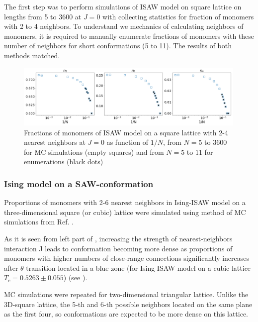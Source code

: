 The first step was to perform simulations of ISAW model on square lattice on lengths from 5 to 3600 at $J=0$ with collecting statistics for fraction of monomers with 2 to 4 neighbors. 
To understand we mechanics of calculating neighbors of monomers, it is required to manually enumerate fractions of monomers with these number of neighbors for short conformations (5 to 11). 
The results of both methods matched.

\begin{figure}[h!]
    \centering
    \includegraphics[width=0.99\textwidth]{Images/ISAWJ0_Bulk2-4.png}
    \caption{Fractions of monomers of ISAW model on a square lattice with 2-4 nearest neighbors at $J=0$ as function of $1/N$, from $N = 5$ to $3600$ for MC simulations (empty squares) and from $N = 5$ to $11$ for enumerations (black dots)}
    \label{fig:Ising_vs_ISAW}
\end{figure}

\subsubsection{Ising model on a SAW-conformation}

Proportions of monomers with 2-6 nearest neighbors in Ising-ISAW model on a three-dimensional square (or cubic) lattice were simulated using method of MC simulations from Ref. \cite{faizullina2021critical}.

As it is seen from left part of , increasing the strength of nearest-neighbors interaction J leads to conformation becoming more dense as proportions of monomers with higher numbers of close-range connections significantly increases after $\theta$-transition located in a blue zone (for Ising-ISAW model on a cubic lattice $T_{c} = 0.5263 \pm 0.055$\cite{Foster2021}) (see ).

MC simulations were repeated for two-dimensional triangular lattice. 
Unlike the 3D-square lattice, the 5-th and 6-th possible neighbors located on the same plane as the first four, so conformations are expected to be more dense on this lattice.

